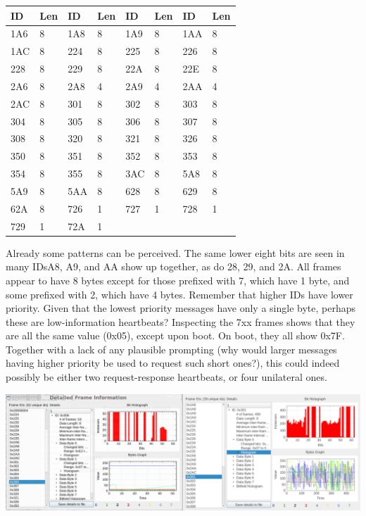 \documentclass[letterpaper,10pt]{article}
\begin{document}
\begin{center}
\begin{tabular}[pos]{ | l | l | l | l | l | l | l | l | }
  \hline
ID & Len & ID & Len & ID & Len & ID & Len \\
  \hline
  1A6 & 8 & 1A8 & 8 & 1A9 & 8 & 1AA & 8 \\
  1AC & 8 & 224 & 8 & 225 & 8 & 226 & 8 \\
  228 & 8 & 229 & 8 & 22A & 8 & 22E & 8 \\
  2A6 & 8 & 2A8 & 4 & 2A9 & 4 & 2AA & 4 \\
  2AC & 8 & 301 & 8 & 302 & 8 & 303 & 8 \\
  304 & 8 & 305 & 8 & 306 & 8 & 307 & 8 \\
  308 & 8 & 320 & 8 & 321 & 8 & 326 & 8 \\
  350 & 8 & 351 & 8 & 352 & 8 & 353 & 8 \\
  354 & 8 & 355 & 8 & 3AC & 8 & 5A8 & 8 \\
  5A9 & 8 & 5AA & 8 & 628 & 8 & 629 & 8 \\
  62A & 8 & 726 & 1 & 727 & 1 & 728 & 1 \\
  \cline{5-8}
  729 & 1 & 72A & 1 \\
  \cline{1-4}
\end{tabular}
\end{center}

Already some patterns can be perceived. The same lower eight bits are seen in
many IDs{\textemdash}A8, A9, and AA show up together, as do 28, 29, and 2A. All frames
appear to have 8 bytes except for those prefixed with 7, which have 1 byte, and
some prefixed with 2, which have 4 bytes. Remember that higher IDs have lower
priority. Given that the lowest priority messages have only a single byte,
perhaps these are low-information heartbeats? Inspecting the 7xx frames
shows that they are all the same value (0x05), except upon boot. On boot,
they all show 0x7F. Together with a lack of any plausible prompting (why would
larger messages having higher priority be used to request such short ones?),
this could indeed possibly be either two request-response heartbeats, or four
unilateral ones.

\begin{center}
\includegraphics[width=.9\linewidth]{savvycan-dissimilar.png}
\end{center}
\end{document}
